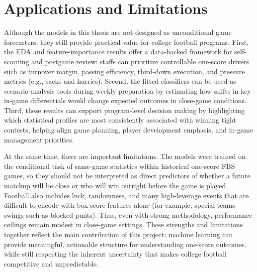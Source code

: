 \documentclass[11pt]{amsart}
\theoremstyle{definition}                  %
\theoremstyle{remark}                       %
\numberwithin{equation}{section}
\begin{document}
\section{Applications and Limitations}
Although the models in this thesis are not designed as unconditional game forecasters, they still provide practical value for college football programs. First, the EDA and feature-importance results offer a data-backed framework for self-scouting and postgame review: staffs can prioritize controllable one-score drivers such as turnover margin, passing efficiency, third-down execution, and pressure metrics (e.g., sacks and hurries). Second, the fitted classifiers can be used as scenario-analysis tools during weekly preparation by estimating how shifts in key in-game differentials would change expected outcomes in close-game conditions. Third, these results can support program-level decision making by highlighting which statistical profiles are most consistently associated with winning tight contests, helping align game planning, player development emphasis, and in-game management priorities.

At the same time, there are important limitations. The models were trained on the conditional task of same-game statistics within historical one-score FBS games, so they should not be interpreted as direct predictors of whether a future matchup will be close or who will win outright before the game is played. Football also includes luck, randomness, and many high-leverage events that are difficult to encode with box-score features alone (for example, special-teams swings such as blocked punts). Thus, even with strong methodology, performance ceilings remain modest in close-game settings. These strengths and limitations together reflect the main contribution of this project: machine learning can provide meaningful, actionable structure for understanding one-score outcomes, while still respecting the inherent uncertainty that makes college football competitive and unpredictable.

\end{document}

